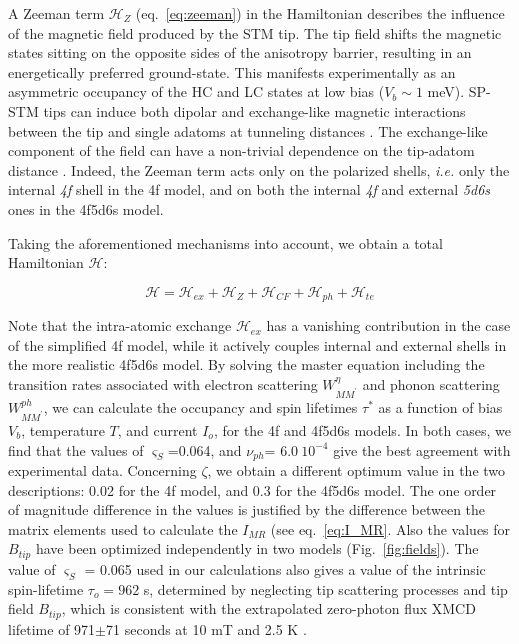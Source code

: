 \documentclass[
reprint,amsmath,amssymb,aps]{revtex4-2}
\begin{document}
A Zeeman term $\mathcal{H}_Z$ (eq.~\ref{eq:zeeman}) in the Hamiltonian describes the influence of the magnetic field produced by the STM tip. The tip field shifts the magnetic states sitting on the opposite sides of the anisotropy barrier, resulting in an energetically preferred ground-state. This manifests experimentally as an asymmetric occupancy of the HC and LC states at low bias ($V_b\sim1$ meV). SP-STM tips can induce both dipolar and exchange-like magnetic interactions between the tip and single adatoms at tunneling distances \cite{yang2019}. The exchange-like component of the field can have a non-trivial dependence on the tip-adatom distance \cite{hauptmannQuantifyingExchangeForces2020,tao_SwitchingSingleSpin_2009,lazoFirstprinciplesStudyMagnetic2011,lazoRoleTipSize2008}. Indeed, the Zeeman term acts only on the polarized shells, \textit{i.e.} only the internal \textit{4f} shell in the 4f model, and on both the internal \textit{4f} and external \textit{5d6s} ones in the 4f5d6s model.

Taking the aforementioned mechanisms into account, we obtain a total Hamiltonian $\mathcal{H}$:

\begin{equation}
\mathcal{H} = \mathcal{H}_{ex} + \mathcal{H}_{Z} + \mathcal{H}_{CF}  + \mathcal{H}_{ph} + \mathcal{H}_{te}
\end{equation}


Note that the intra-atomic exchange $\mathcal{H}_{ex}$ has a vanishing contribution in the case of the simplified 4f model, while it actively couples internal and external shells in the more realistic 4f5d6s model.
By solving the master equation including the transition rates associated with electron scattering $W_{MM^{\prime}}^{\eta}$ and phonon scattering $W_{MM^{\prime}}^{ph}$, we can calculate the occupancy and spin lifetimes $\tau^{*}$ as a function of bias $V_{b}$, temperature $T$, and current $I_{o}$, for the 4f and 4f5d6s models. 
In both cases, we find that the values of $\varsigma_S$=0.064, and  $\nu_{ph}$= $6.0\ 10^{-4}$ give the best agreement with experimental data. Concerning $\zeta$, we obtain a different optimum value in the two descriptions: 0.02 for the 4f model, and 0.3 for the 4f5d6s model. The one order of magnitude difference in the values is justified by the difference between the matrix elements used to calculate the $I_{MR}$ (see eq.~\ref{eq:I_MR}.  Also the values for $B_{tip}$ have been optimized independently in two models (Fig.~\ref{fig:fields}).
The value of $\varsigma_S$ = 0.065 used in our calculations also gives a value of the intrinsic spin-lifetime $\tau_o=962$ s, determined by neglecting tip scattering processes and tip field $B_{tip}$, which is consistent with the extrapolated zero-photon flux XMCD lifetime of 971$\pm$71 seconds at 10 mT and 2.5 K \citep{baltic2016}.
\end{document}
